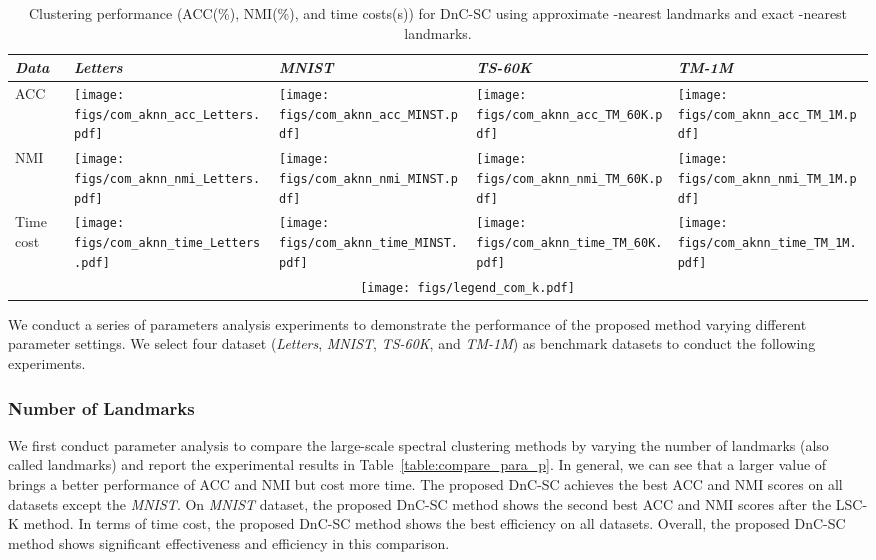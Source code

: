 \documentclass[a4paper,fleqn]{cas-dc}
\begin{document}
\begin{table}\centering
  \caption{Clustering performance (ACC(\%), NMI(\%), and time costs(s)) for DnC-SC using approximate -nearest landmarks and exact -nearest landmarks.}
  \label{table:compare_approxKNN}
  \begin{threeparttable}
    \begin{tabular}{m{0.75cm}<{\centering}|m{1.45cm}<{\centering}m{1.45cm}<{\centering}m{1.45cm}<{\centering}m{1.45cm}<{\centering}}
      \toprule
      \emph{Data} & \emph{Letters} & \emph{MNIST} & \emph{TS-60K} & \emph{TM-1M} \\
      \midrule
      \multirow{1}{*}{ACC}
      &\texttt{[image: figs/com\_aknn\_acc\_Letters.pdf]}
      &\texttt{[image: figs/com\_aknn\_acc\_MINST.pdf]}
      &\texttt{[image: figs/com\_aknn\_acc\_TM\_60K.pdf]}
      &\texttt{[image: figs/com\_aknn\_acc\_TM\_1M.pdf]}\\
      NMI
      &\texttt{[image: figs/com\_aknn\_nmi\_Letters.pdf]}
      &\texttt{[image: figs/com\_aknn\_nmi\_MINST.pdf]}
      &\texttt{[image: figs/com\_aknn\_nmi\_TM\_60K.pdf]}
      &\texttt{[image: figs/com\_aknn\_nmi\_TM\_1M.pdf]}\\
      Time cost
      &\texttt{[image: figs/com\_aknn\_time\_Letters.pdf]}
      &\texttt{[image: figs/com\_aknn\_time\_MINST.pdf]}
      &\texttt{[image: figs/com\_aknn\_time\_TM\_60K.pdf]}
      &\texttt{[image: figs/com\_aknn\_time\_TM\_1M.pdf]}\\
      &\multicolumn{4}{c}{\texttt{[image: figs/legend\_com\_k.pdf]}}\\
      \bottomrule
    \end{tabular}
  \end{threeparttable}
\end{table}

We conduct a series of parameters analysis experiments to demonstrate the performance of the proposed method varying different parameter settings. 
We select four dataset (\emph{Letters}, \emph{MNIST}, \emph{TS-60K}, and \emph{TM-1M}) as benchmark datasets to conduct the following experiments. 

\subsubsection{Number of Landmarks }
\label{sec:para_p}

We first conduct parameter analysis to compare the large-scale spectral clustering methods by varying the number of landmarks  (also called landmarks) and report the experimental results in Table~\ref{table:compare_para_p}.
In general, we can see that a larger value of  brings a better performance of ACC and NMI but cost more time.
The proposed DnC-SC achieves the best ACC and NMI scores on all datasets except the \emph{MNIST}.
On \emph{MNIST} dataset, the proposed DnC-SC method shows the second best ACC and NMI scores after the LSC-K method. 
In terms of time cost, the proposed DnC-SC method shows the best efficiency on all datasets. 
Overall, the proposed DnC-SC method shows significant effectiveness and efficiency in this comparison. 
\end{document}
